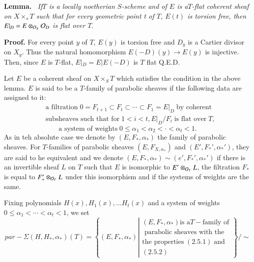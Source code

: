 \medskip
\noindent
{\bfseries {} Lemma. \label{chap12-Lemma-2.3}}~\textit{If\pageoriginale $T$ is a locally noetherian $S$-scheme and of $E$ is a$T$-flat coherent sheaf on $X \times_{s}T$ such that for every geometric point t of $T$, $E(t)$ is torsion free, then $E|_{D}=E\otimes_{\mathcal{O}_{X}}\mathcal{O}_{D}$ is flat over $T$}.

\medskip
\noindent
{\bfseries Proof.} For every point $y$ of $T$, $E(y)$ is torsion free and $D_{y}$ is a Cartier divisor on $X_{y}$. Thus the natural homomorphism $E(-D)(y)\rightarrow E(y)$ is injective. Then, since $E$ is $T$-flat, $E|_{D}=E|E(-D)$ is $T$ flat \hfill Q.E.D.

Let $E$ be a coherent sheaf on $X \times_{S}T$ which satisfies the condition in the above lemma. $E$ is said to be a $T$-family of parabolic sheaves if the following data are assigned to it:
\begin{align}\label{chap12-eq-2.4.1}
 &\text{a filtration}\; 0=F_{t+1}\subset F_{t} \subset \cdots \subset F_{1}= E|_{D}\; \text{by coherent}\tag{2.4.1}\\
  &      \text{subsheaves such that for}\; 1 <i < t, E|_{D}/F_{i}\; \text{is flat over}\; T\nonumber, 
\end{align}
\begin{equation}\label{chap12-eq-2.4.2}
\text{a system of weights}\; 0 \leq \alpha_{1} < \alpha_{2} < \cdot < \alpha_{t} < 1\tag{2.4.2}.
\end{equation}
As in teh absolute case we denote by $(E, F_{*}, \alpha_{*})$ the family of parabolic sheaves. For $T$-families of parabolic sheaves $(E, F_{X, \alpha_{*}})$ and $(E',F_{*}', \alpha_{*}')$, they are said to he equivalent and we denote $(E, F_{*}, \alpha_{*}) \sim (e', F_{*}', \alpha_{*}')$ if there is an invertible sheaf $L$ on $T$ such that $E$ is isomorphic to $E' \otimes_{\mathcal{O}_{T}} L$, the filtration $F_{*}$ is equal to $F_{*}'\otimes_{\mathcal{O}_{T}} L$ under this isomorphism and if the systems of weights are the same.

Fixing polynomials $H(x), H_{1}(x), \ldots H_{t}(x)$ and a system of weights
$0 \leq \alpha_{1} < \cdots < \alpha_{t} < 1$, we set
{\small
$$
par-\Sigma(H,H_{*}, \alpha_{*})(T)=\left\{(E, F_{*}, \alpha_{*})\left| \begin{matrix}
(E, F_{*}, \alpha_{*}) \text{is a} T-\text{family of}\\
  \text{ parabolic sheaves with the}\\
  \text{the properties}\; (2.5.1)\; \text{and}\\
  (2.5.2)            
\end{matrix}\right.\right\}\big/\sim
$$}\relax

